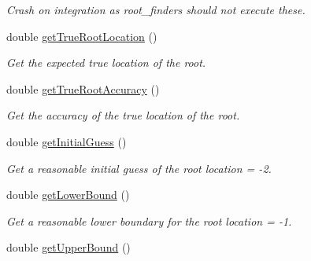 \begin{DoxyCompactItemize}
\begin{DoxyCompactList}\small\item\em Crash on integration as root\+\_\+finders should not execute these. \end{DoxyCompactList}\item 
double \hyperlink{structtudat_1_1unit__tests_1_1TestFunction3_a751fd2f106e530a19197e20ddd28cf46}{get\+True\+Root\+Location} ()\hypertarget{structtudat_1_1unit__tests_1_1TestFunction3_a751fd2f106e530a19197e20ddd28cf46}{}\label{structtudat_1_1unit__tests_1_1TestFunction3_a751fd2f106e530a19197e20ddd28cf46}

\begin{DoxyCompactList}\small\item\em Get the expected true location of the root. \end{DoxyCompactList}\item 
double \hyperlink{structtudat_1_1unit__tests_1_1TestFunction3_a8f14d462ef7336fcdb342f18a08a8999}{get\+True\+Root\+Accuracy} ()\hypertarget{structtudat_1_1unit__tests_1_1TestFunction3_a8f14d462ef7336fcdb342f18a08a8999}{}\label{structtudat_1_1unit__tests_1_1TestFunction3_a8f14d462ef7336fcdb342f18a08a8999}

\begin{DoxyCompactList}\small\item\em Get the accuracy of the true location of the root. \end{DoxyCompactList}\item 
double \hyperlink{structtudat_1_1unit__tests_1_1TestFunction3_a90e21fd7138085d65fa2854a1e55f01e}{get\+Initial\+Guess} ()\hypertarget{structtudat_1_1unit__tests_1_1TestFunction3_a90e21fd7138085d65fa2854a1e55f01e}{}\label{structtudat_1_1unit__tests_1_1TestFunction3_a90e21fd7138085d65fa2854a1e55f01e}

\begin{DoxyCompactList}\small\item\em Get a reasonable initial guess of the root location = -\/2. \end{DoxyCompactList}\item 
double \hyperlink{structtudat_1_1unit__tests_1_1TestFunction3_a82eb0c254252f50602e15b42b2e51205}{get\+Lower\+Bound} ()\hypertarget{structtudat_1_1unit__tests_1_1TestFunction3_a82eb0c254252f50602e15b42b2e51205}{}\label{structtudat_1_1unit__tests_1_1TestFunction3_a82eb0c254252f50602e15b42b2e51205}

\begin{DoxyCompactList}\small\item\em Get a reasonable lower boundary for the root location = -\/1. \end{DoxyCompactList}\item 
double \hyperlink{structtudat_1_1unit__tests_1_1TestFunction3_aa8d259fc617d9bc9adba22c0f1b09b9a}{get\+Upper\+Bound} ()\hypertarget{structtudat_1_1unit__tests_1_1TestFunction3_aa8d259fc617d9bc9adba22c0f1b09b9a}{}\label{structtudat_1_1unit__tests_1_1TestFunction3_aa8d259fc617d9bc9adba22c0f1b09b9a}


\end{DoxyCompactItemize}

